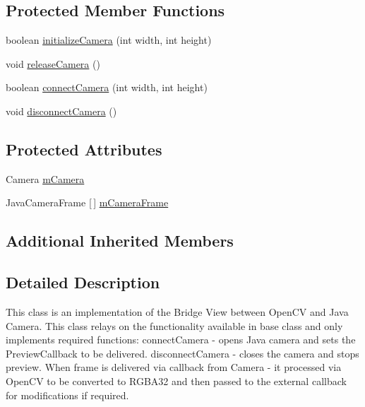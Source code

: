 \subsection*{Protected Member Functions}
\begin{DoxyCompactItemize}
\item 
boolean \mbox{\hyperlink{classorg_1_1opencv_1_1android_1_1_java_camera_view_a29141b72435ba44645056d5005feb06f}{initialize\+Camera}} (int width, int height)
\item 
void \mbox{\hyperlink{classorg_1_1opencv_1_1android_1_1_java_camera_view_ac5b5afc09c654c912647e52110845c78}{release\+Camera}} ()
\item 
boolean \mbox{\hyperlink{classorg_1_1opencv_1_1android_1_1_java_camera_view_ace3c5843b95670a26e01292ea0acb84b}{connect\+Camera}} (int width, int height)
\item 
void \mbox{\hyperlink{classorg_1_1opencv_1_1android_1_1_java_camera_view_a557657f3020c986d5ab05c74119a1a95}{disconnect\+Camera}} ()
\end{DoxyCompactItemize}
\subsection*{Protected Attributes}
\begin{DoxyCompactItemize}
\item 
Camera \mbox{\hyperlink{classorg_1_1opencv_1_1android_1_1_java_camera_view_a117a6e6ce3694460b39132e0e78f46af}{m\+Camera}}
\item 
Java\+Camera\+Frame \mbox{[}$\,$\mbox{]} \mbox{\hyperlink{classorg_1_1opencv_1_1android_1_1_java_camera_view_aa7ed7f3c25792dd2161af56887beb627}{m\+Camera\+Frame}}
\end{DoxyCompactItemize}
\subsection*{Additional Inherited Members}


\subsection{Detailed Description}
This class is an implementation of the Bridge View between Open\+CV and Java Camera. This class relays on the functionality available in base class and only implements required functions\+: connect\+Camera -\/ opens Java camera and sets the Preview\+Callback to be delivered. disconnect\+Camera -\/ closes the camera and stops preview. When frame is delivered via callback from Camera -\/ it processed via Open\+CV to be converted to R\+G\+B\+A32 and then passed to the external callback for modifications if required. 

